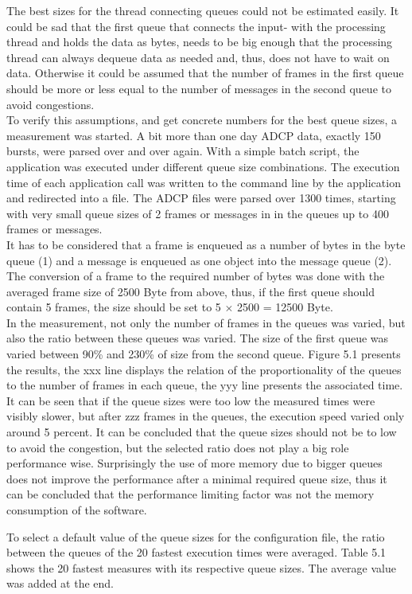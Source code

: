 The best sizes for the thread connecting queues could not be estimated easily. It could be sad that the first queue that connects the input- with the processing thread and holds the data as bytes, needs to be big enough that the processing thread can always dequeue data as needed and, thus, does not have to wait on data. Otherwise it could be assumed that the number of frames in the first queue should be more or less equal to the number of messages in the second queue to avoid congestions.\\ 
To verify this assumptions, and get concrete numbers for the best queue sizes, a measurement was started. A bit more than one day ADCP data, exactly 150 bursts, were parsed over and over again. With a simple batch script, the application was executed under different queue size combinations. The execution time of each application call was written to the command line by the application and redirected into a file. The ADCP files were parsed over 1300 times, starting with very small queue sizes of 2 frames or messages in in the queues up to 400 frames or messages. \\
It has to be considered that a frame is enqueued as a number of bytes in the byte queue (1) and a message is enqueued as one object into the message queue (2). The conversion of a frame to the required number of bytes was done with the averaged frame size of 2500 Byte from above, thus, if the first queue should contain 5 frames, the size should be set to 5 $\times$ 2500 = 12500 Byte.\\
In the measurement, not only the number of frames in the queues was varied, but also the ratio between these queues was varied. The size of the first queue was varied between 90\% and 230\% of size from the second queue. Figure 5.1 presents the results, the xxx line displays the relation of the proportionality of the queues to the number of frames in each queue, the yyy line presents the associated time. It can be seen that if the queue sizes were too low the measured times were visibly slower, but after zzz frames in the queues, the execution speed varied only around 5 percent. It can be concluded that the queue sizes should not be to low to avoid the congestion, but the selected ratio does not play a big role performance wise. Surprisingly the use of more memory due to bigger queues does not improve the performance after a minimal required queue size, thus it can be concluded that the performance limiting factor was not the memory consumption of the software.

To select a default value of the queue sizes for the configuration file, the ratio between the queues of the 20 fastest execution times were averaged. Table 5.1 shows the 20 fastest measures with its respective queue sizes. The average value was added at the end.

